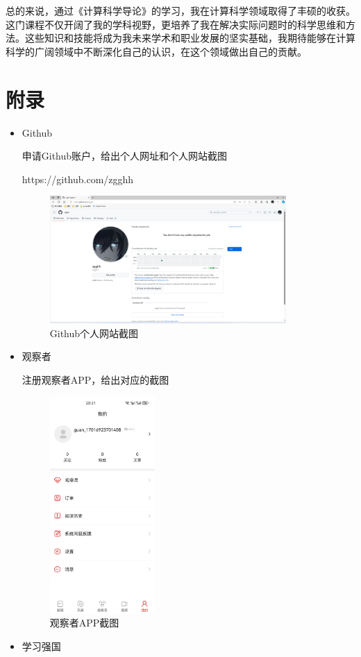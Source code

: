 \documentclass[square]{article}
\begin{document}
总的来说，通过《计算科学导论》的学习，我在计算科学领域取得了丰硕的收获。这门课程不仅开阔了我的学科视野，更培养了我在解决实际问题时的科学思维和方法。这些知识和技能将成为我未来学术和职业发展的坚实基础，我期待能够在计算科学的广阔领域中不断深化自己的认识，在这个领域做出自己的贡献。

\section{附录}
\begin{itemize}
    \item Github
    
    申请Github账户，给出个人网址和个人网站截图\par
    https://github.com/zgghh\par
    \begin{figure}[h!]
    	\centering
    	\includegraphics[width=9cm]{github.png}
    	\caption{Github个人网站截图}
    	\label{fig:github}
    \end{figure}
    \pagebreak
   
    \item 观察者
    
    注册观察者APP，给出对应的截图
    
    \begin{figure}[h!]
    	\centering
    	\includegraphics[width=4cm]{viewer}
    	\caption{观察者APP截图}
    	\label{fig:viewer}
    \end{figure}
    \item 学习强国
    

\end{itemize}
\end{document}
